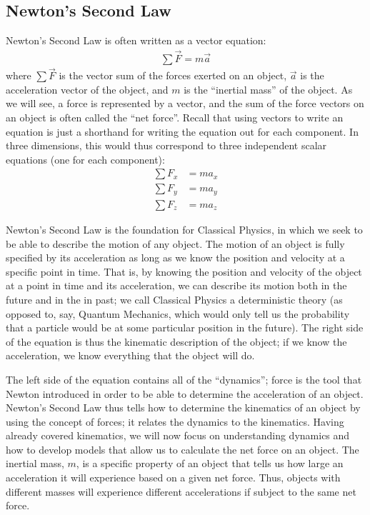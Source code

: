 \subsection{Newton's Second Law}
Newton's Second Law is often written as a vector equation:
\begin{align*}
\sum \vec F = m\vec a
\end{align*}
where $\sum \vec F$ is the vector sum of the forces exerted on an object, $\vec a$ is the acceleration vector of the object, and $m$ is the ``inertial mass'' of the object. As we will see, a force is represented by a vector, and the sum of the force vectors on an object is often called the ``net force''. Recall that using vectors to write an equation is just a shorthand for writing the equation out for each component. In three dimensions, this would thus correspond to three independent scalar equations (one for each component):
\begin{align*}
\sum F_x &= ma_x \\
\sum F_y &= ma_y \\
\sum F_z &= ma_z
\end{align*}

Newton's Second Law is the foundation for Classical Physics, in which we seek to be able to describe the motion of any object. The motion of an object is fully specified by its acceleration as long as we know the position and velocity at a specific point in time. That is, by knowing the position and velocity of the object at a point in time and its acceleration, we can describe its motion both in the future and in the in past; we call Classical Physics a deterministic theory (as opposed to, say, Quantum Mechanics, which would only tell us the probability that a particle would be at some particular position in the future). The right side of the equation is thus the kinematic description of the object; if we know the acceleration, we know everything that the object will do.

The left side of the equation contains all of the ``dynamics''; force is the tool that Newton introduced in order to be able to determine the acceleration of an object. Newton's Second Law thus tells how to determine the kinematics of an object by using the concept of forces; it relates the dynamics to the kinematics. Having already covered kinematics, we will now focus on understanding dynamics and how to develop models that allow us to calculate the net force on an object. The inertial mass, $m$, is a specific property of an object that tells us how large an acceleration it will experience based on a given net force. Thus, objects with different masses will experience different accelerations if subject to the same net force.


